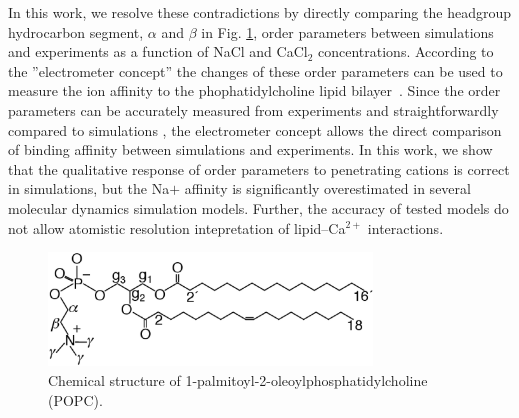 \documentclass[pre,aps,floatfix,authordate1-4,twocolumn]{revtex4-1}
\begin{document}
In this work, we resolve these contradictions by directly comparing the headgroup hydrocarbon 
segment, $\alpha$ and $\beta$ in Fig. \ref{POPCstructure}, order parameters
between simulations and experiments as a function of NaCl and CaCl$_2$ concentrations. 
According to the ''electrometer concept'' the changes of these order parameters can be 
used to measure the ion affinity to the phophatidylcholine lipid bilayer~\cite{akutsu81,altenbach84,seelig87,scherer89}.
Since the order parameters can be accurately measured from experiments and straightforwardly compared to 
simulations \cite{ollila15}, the electrometer concept allows the direct comparison of binding affinity between simulations
and experiments. In this work, we show that the qualitative response of order parameters
to penetrating cations is correct in simulations, but the Na$ {+}$ affinity is significantly
overestimated in several molecular dynamics simulation models. Further, the 
accuracy of tested models do not allow atomistic resolution intepretation of 
lipid--Ca$^{2+}$ interactions.

\begin{figure}[]
  \centering
  \includegraphics[width=8.6cm]{../Fig/POPCstructure.eps}

  \caption{\label{POPCstructure}
    Chemical structure of 1-palmitoyl-2-oleoylphosphatidylcholine (POPC).}
  
\end{figure}
\end{document}
